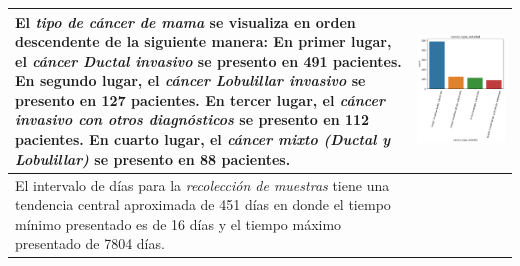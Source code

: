 \begin{table}[!htb]
	\footnotesize
	\begin{threeparttable}
		\begin{tabular}{p{8cm} p{7cm}} \toprule	 
			El \textit{tipo de cáncer de mama} se visualiza en orden descendente de la siguiente manera: En primer lugar, el \textit{cáncer Ductal invasivo} se presento en 491 pacientes. En segundo  lugar, el \textit{cáncer Lobulillar invasivo} se presento en 127 pacientes. En tercer lugar, el \textit{cáncer invasivo con otros diagnósticos} se presento en 112 pacientes. En cuarto lugar,  el \textit{cáncer mixto (Ductal y Lobulillar)} se presento en 88 pacientes.
			
			& \begin{center}\includegraphics[width=1\linewidth]{NOTEBOOK/IMAGENES_DESCRIPTIVAS/6_cancer_type_detailed}\end{center}
			\\ \hline
			El intervalo de días para la \textit{recolección de muestras} tiene una tendencia central aproximada de 451 días en donde el tiempo mínimo presentado es de 16 días y el tiempo máximo presentado de 7804 días.
			

\end{tabular}
\end{threeparttable}
\end{table}
